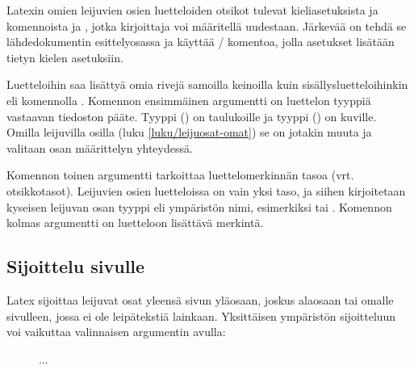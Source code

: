 Latexin omien leijuvien osien luetteloiden otsikot tulevat
kieliasetuksista ja komennoista  ja
, jotka kirjoittaja voi määritellä uudestaan.
Järkevää on tehdä se lähdedokumentin esittelyosassa ja käyttää
\-/ komentoa, jolla asetukset lisätään tietyn kielen
asetuksiin.

\begin{koodilohkosis}
\addto{\captionsfinnish}{
  \renewcommand{\listtablename}{Omat taulukot}
  \renewcommand{\listfigurename}{Omat kuvat}
}
\end{koodilohkosis}

Luetteloihin saa lisättyä omia rivejä samoilla keinoilla kuin
sisällysluetteloihinkin eli komennolla .
Komennon ensimmäinen argumentti on luettelon tyyppiä vastaavan tiedoston
pääte. Tyyppi  () on taulukoille
ja tyyppi  () on kuville. Omilla
leijuvilla osilla (luku \ref{luku/leijuosat-omat}) se on jotakin muuta
ja valitaan osan määrittelyn yhteydessä.

\begin{koodilohkosis}
\end{koodilohkosis}

Komennon toinen argumentti tarkoittaa luettelomerkinnän tasoa (vrt.
otsikkotasot). Leijuvien osien luetteloissa on vain yksi taso, ja siihen
kirjoitetaan kyseisen leijuvan osan tyyppi eli ympäristön nimi,
esimerkiksi  tai . Komennon kolmas
argumentti on luetteloon lisättävä merkintä.

\subsection{Sijoittelu sivulle}
\label{luku/leijuosat-sijoittelu}

Latex sijoittaa leijuvat osat yleensä sivun yläosaan, joskus alaosaan
tai omalle sivulleen, jossa ei ole leipätekstiä lainkaan. Yksittäisen
ympäristön sijoitteluun voi vaikuttaa valinnaisen argumentin avulla:

\begin{koodilohkosis}
\begin{figure}[sijainti]
  ...
\end{figure}
\end{koodilohkosis}

